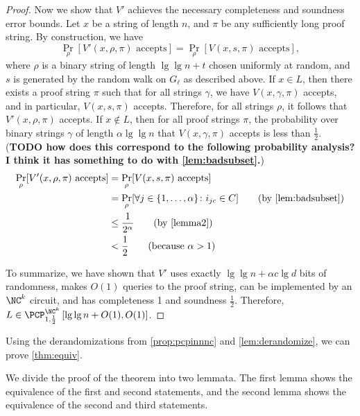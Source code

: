 \documentclass[]{article}
\newcommand{\PCPcs}[5]{\PCP^{#1}_{#2, #3}\left[#4, #5\right]}
\begin{document}
\begin{proof}
  Now we show that $V'$ achieves the necessary completeness and soundness error bounds.
  Let $x$ be a string of length $n$, and $\pi$ be any sufficiently long proof string.
  By construction, we have
  \begin{equation*}
    \Pr_\rho[V'(x, \rho, \pi) \text{ accepts}] = \Pr_\rho[V(x, s, \pi) \text{ accepts}],
  \end{equation*}
  where $\rho$ is a binary string of length $\lg \lg n + t$ chosen uniformly at random, and $s$ is generated by the random walk on $G_\ell$ as described above.
  If $x \in L$, then there exists a proof string $\pi$ such that for all strings $\gamma$, we have $V(x, \gamma, \pi)$ accepts, and in particular, $V(x, s, \pi)$ accepts.
  Therefore, for all strings $\rho$, it follows that $V'(x, \rho, \pi)$ accepts.
  If $x \notin L$, then for all proof strings $\pi$, the probability over binary strings $\gamma$ of length $\alpha \lg \lg n$ that $V(x, \gamma, \pi)$ accepts is less than $\frac{1}{2}$.
  (\textbf{TODO how does this correspond to the following probability analysis? I think it has something to do with \autoref{lem:badsubset}.})
  \begin{align*}
    \Pr_\rho[V'(x, \rho, \pi) \text{ accepts}] & = \Pr_\rho[V(x, s, \pi) \text{ accepts}] \\
    & = \Pr_\rho[\forall j \in \{1, \dotsc, \alpha\} \colon i_{jc} \in C] \qquad \text{(by \autoref{lem:badsubset})} \\
    & \leq \frac{1}{2^\alpha} \qquad \text{(by \autoref{lemma2})} \\
    & < \frac{1}{2} \qquad \text{(because } \alpha > 1)
  \end{align*}

  To summarize, we have shown that $V'$ uses exactly $\lg \lg n + \alpha c \lg d$ bits of randomness, makes $O(1)$ queries to the proof string, can be implemented by an $\NC^k$ circuit, and has completeness 1 and soundness $\frac{1}{2}$.
  Therefore, $L \in \PCPcs{\NC^k}{1}{\frac{1}{2}}{\lg \lg n + O(1)}{O(1)}$.
\end{proof}

Using the derandomizations from \autoref{prop:pcpinnnc} and \autoref{lem:derandomize}, we can prove \autoref{thm:equiv}.

We divide the proof of the theorem into two lemmata.
The first lemma shows the equivalence of the first and second statements, and the second lemma shows the equivalence of the second and third statements.
\end{document}
